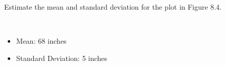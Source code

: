 Estimate the mean and standard deviation for the plot in Figure 8.4. 

\begin{solution}\
    \begin{itemize}
        \item Mean: 68 inches
        \item Standard Deviation: 5 inches
    \end{itemize}
\end{solution}